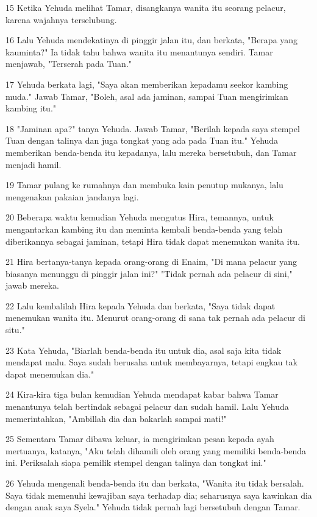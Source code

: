 \par 15 Ketika Yehuda melihat Tamar, disangkanya wanita itu seorang pelacur, karena wajahnya terselubung.
\par 16 Lalu Yehuda mendekatinya di pinggir jalan itu, dan berkata, "Berapa yang kauminta?" Ia tidak tahu bahwa wanita itu menantunya sendiri. Tamar menjawab, "Terserah pada Tuan."
\par 17 Yehuda berkata lagi, "Saya akan memberikan kepadamu seekor kambing muda." Jawab Tamar, "Boleh, asal ada jaminan, sampai Tuan mengirimkan kambing itu."
\par 18 "Jaminan apa?" tanya Yehuda. Jawab Tamar, "Berilah kepada saya stempel Tuan dengan talinya dan juga tongkat yang ada pada Tuan itu." Yehuda memberikan benda-benda itu kepadanya, lalu mereka bersetubuh, dan Tamar menjadi hamil.
\par 19 Tamar pulang ke rumahnya dan membuka kain penutup mukanya, lalu mengenakan pakaian jandanya lagi.
\par 20 Beberapa waktu kemudian Yehuda mengutus Hira, temannya, untuk mengantarkan kambing itu dan meminta kembali benda-benda yang telah diberikannya sebagai jaminan, tetapi Hira tidak dapat menemukan wanita itu.
\par 21 Hira bertanya-tanya kepada orang-orang di Enaim, "Di mana pelacur yang biasanya menunggu di pinggir jalan ini?" "Tidak pernah ada pelacur di sini," jawab mereka.
\par 22 Lalu kembalilah Hira kepada Yehuda dan berkata, "Saya tidak dapat menemukan wanita itu. Menurut orang-orang di sana tak pernah ada pelacur di situ."
\par 23 Kata Yehuda, "Biarlah benda-benda itu untuk dia, asal saja kita tidak mendapat malu. Saya sudah berusaha untuk membayarnya, tetapi engkau tak dapat menemukan dia."
\par 24 Kira-kira tiga bulan kemudian Yehuda mendapat kabar bahwa Tamar menantunya telah bertindak sebagai pelacur dan sudah hamil. Lalu Yehuda memerintahkan, "Ambillah dia dan bakarlah sampai mati!"
\par 25 Sementara Tamar dibawa keluar, ia mengirimkan pesan kepada ayah mertuanya, katanya, "Aku telah dihamili oleh orang yang memiliki benda-benda ini. Periksalah siapa pemilik stempel dengan talinya dan tongkat ini."
\par 26 Yehuda mengenali benda-benda itu dan berkata, "Wanita itu tidak bersalah. Saya tidak memenuhi kewajiban saya terhadap dia; seharusnya saya kawinkan dia dengan anak saya Syela." Yehuda tidak pernah lagi bersetubuh dengan Tamar.
